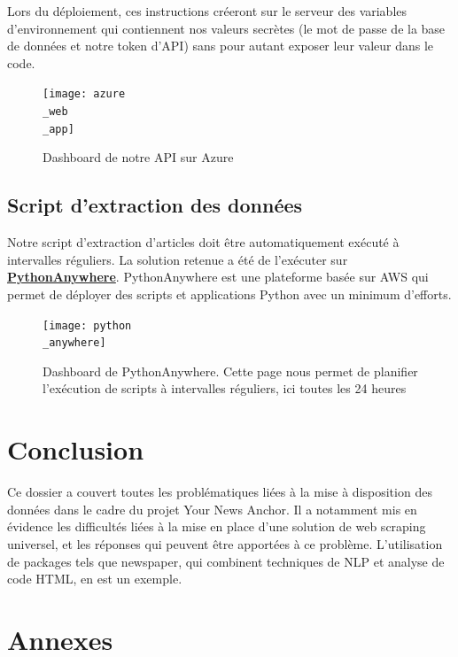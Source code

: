 \documentclass[french]{article}
\begin{document}
    Lors du déploiement, ces instructions créeront sur le serveur des variables d'environnement qui contiennent nos valeurs secrètes (le mot de passe de la base de données et notre token d'API) sans pour autant exposer leur valeur dans le code.

    \begin{figure}[h]
        \texttt{[image: azure\\\_web\\\_app]}
        \centering
        \caption{Dashboard de notre API sur Azure}
        \centering
    \end{figure}

    \subsection{Script d'extraction des données}

    Notre script d'extraction d'articles doit être automatiquement exécuté à intervalles réguliers. La solution retenue a été de l'exécuter sur \textbf{\href{https://www.pythonanywhere.com/}{PythonAnywhere}}. PythonAnywhere est une plateforme basée sur AWS qui permet de déployer des scripts et applications Python avec un minimum d'efforts.

    \begin{figure}[h]
        \texttt{[image: python\\\_anywhere]}
        \centering
        \caption{Dashboard de PythonAnywhere. Cette page nous permet de planifier l'exécution de scripts à intervalles réguliers, ici toutes les 24 heures}
        \centering
    \end{figure}

    \section*{Conclusion}

    Ce dossier a couvert toutes les problématiques liées à la mise à disposition des données dans le cadre du projet Your News Anchor. Il a notamment mis en évidence les difficultés liées à la mise en place d'une solution de web scraping universel, et les réponses qui peuvent être apportées à ce problème. L'utilisation de packages tels que newspaper, qui combinent techniques de NLP et analyse de code HTML, en est un exemple.


    \appendix
    \newpage
    \section*{Annexes \huge \centering}
\end{document}
